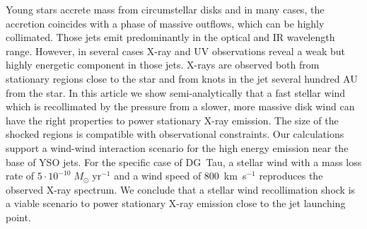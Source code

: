 Young stars accrete mass from circumstellar disks and in many cases, the accretion coincides with a phase of massive outflows, which can be highly collimated. Those jets emit predominantly in the optical and IR wavelength range. However, in several cases X-ray and UV observations reveal a weak but highly energetic component in those jets. X-rays are observed both from stationary regions close to the star and from knots in the jet several hundred AU from the star. 
In this article we show semi-analytically that a fast stellar wind which is recollimated by the pressure from a slower, more massive disk wind can have the right properties to power stationary X-ray emission. The size of the shocked regions is compatible with observational constraints. Our calculations support a wind-wind interaction scenario for the high energy emission near the base of YSO jets. For the specific case of DG~Tau, a stellar wind with a mass loss rate of $5\cdot10^{-10}\;M_{\odot}\;\mathrm{ yr}^{-1}$ and a wind speed of 800~km~s$^{-1}$ reproduces the observed X-ray spectrum.
We conclude that a stellar wind recollimation shock is a viable scenario to power stationary X-ray emission close to the jet launching point.
